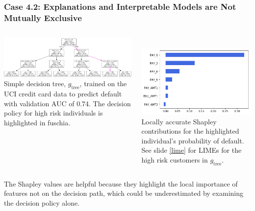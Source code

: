\documentclass[11pt,aspectratio=169,hyperref={colorlinks}]{beamer}
\begin{document}
	\begin{frame}[label={dt}]
	
		\frametitle{\normalsize\textbf{Case 4.2}: Explanations and Interpretable Models are \textbf{Not Mutually Exclusive}}
		
		\begin{columns}
				
			\centering		
			\includegraphics[height=.45\linewidth, width=1.15\linewidth]{../img/dt.png}\\
			\vspace{5pt}
  			\tiny{Simple decision tree, $g_{\text{tree}}$, trained on the UCI credit card data to predict default with validation AUC of 0.74. The decision policy for high risk individuals is highlighted in \textcolor{fuschia}{fuschia}.}

			\hspace{50pt}
			\centering
			\vspace{2pt}\\
  			\includegraphics[height=.5\linewidth, width=.8\linewidth]{../img/shap_blue.png}\\
  			\vspace{5pt}
  			\tiny{Locally accurate Shapley contributions for the highlighted individual's probability of default. See slide \ref{lime} for LIMEs for the high risk customers in $g_{\text{tree}}$.}

		\end{columns}
		\vspace{10pt}

	\scriptsize{The Shapley values are helpful because they highlight the local importance of features not on the decision path, which could be underestimated by examining the decision policy alone.}
	
	\end{frame}
	
\end{document}
